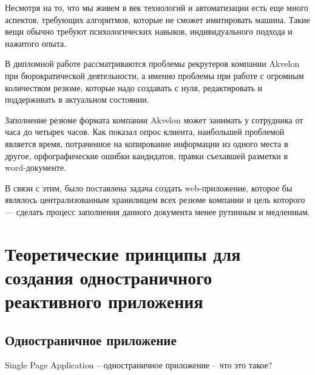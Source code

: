 \documentclass[12pt, a4paper]{diplom}
\begin{document}
\medskip

\tableofcontents[Содержание]


Несмотря на то, что мы живем в век технологий и автоматизации есть еще много аспектов,
требующих алгоритмов, которые не сможет имитировать машина. Такие вещи обычно требуют
психологических навыков, индивидуального подхода и нажитого опыта.

В дипломной работе рассматриваются проблемы рекрутеров компании
Akvelon при бюрократической деятельности,
а именно проблемы при работе с огромным количеством резюме, которые надо создавать с нуля, редактировать и
поддерживать в актуальном состоянии.

Заполнение резюме формата компании Akvelon
может занимать у сотрудника от часа до четырех часов. Как показал опрос клиента, наибольшей проблемой является время, потраченное
на копирование информации из одного места в другое, орфографические ошибки кандидатов, правки
съехавшей разметки в word-документе.

В связи с этим, было поставлена задача создать web-приложение, которое бы являлось централизованным хранилищем
всех резюме компании и цель которого — сделать процесс заполнения данного документа менее рутинным и медленным.

\chapter{Теоретические принципы для создания одностраничного реактивного приложения}

\section{Одностраничное приложение}
Single Page Application – одностраничное приложение – что это такое?
\end{document}
